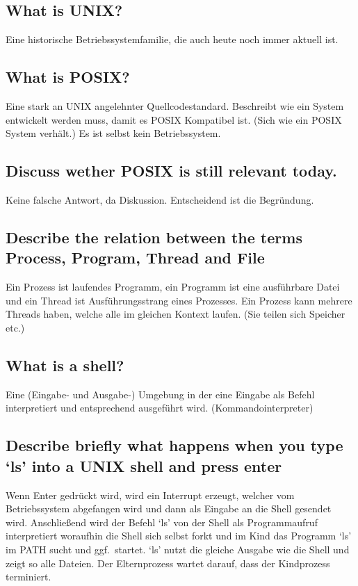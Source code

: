 \subsection{What is UNIX?}
Eine historische Betriebssystemfamilie, die auch heute noch immer aktuell ist.

\subsection{What is POSIX?}
Eine stark an UNIX angelehnter Quellcodestandard.
Beschreibt wie ein System entwickelt werden muss, damit es POSIX Kompatibel ist.
(Sich wie ein POSIX System verhält.)
Es ist selbst kein Betriebssystem.

\subsection{Discuss wether POSIX is still relevant today.}
Keine falsche Antwort, da Diskussion.
Entscheidend ist die Begründung.

\subsection{Describe the relation between the terms Process, Program, Thread and File}
Ein Prozess ist laufendes Programm, ein Programm ist eine ausführbare Datei und ein Thread ist Ausführungsstrang eines Prozesses.
Ein Prozess kann mehrere Threads haben, welche alle im gleichen Kontext laufen. (Sie teilen sich Speicher etc.)

\subsection{What is a shell?}
Eine (Eingabe- und Ausgabe-) Umgebung in der eine Eingabe als Befehl interpretiert und entsprechend ausgeführt wird.
(Kommandointerpreter)

\subsection{Describe briefly what happens when you type `ls' into a UNIX shell and press enter}
Wenn Enter gedrückt wird, wird ein Interrupt erzeugt, welcher vom Betriebssystem abgefangen wird und dann als Eingabe an die Shell gesendet wird.
Anschließend wird der Befehl `ls' von der Shell als Programmaufruf interpretiert woraufhin die Shell sich selbst forkt und im Kind das Programm `ls' im PATH sucht und ggf.\ startet.
`ls' nutzt die gleiche Ausgabe wie die Shell und zeigt so alle Dateien.
Der Elternprozess wartet darauf, dass der Kindprozess terminiert.

